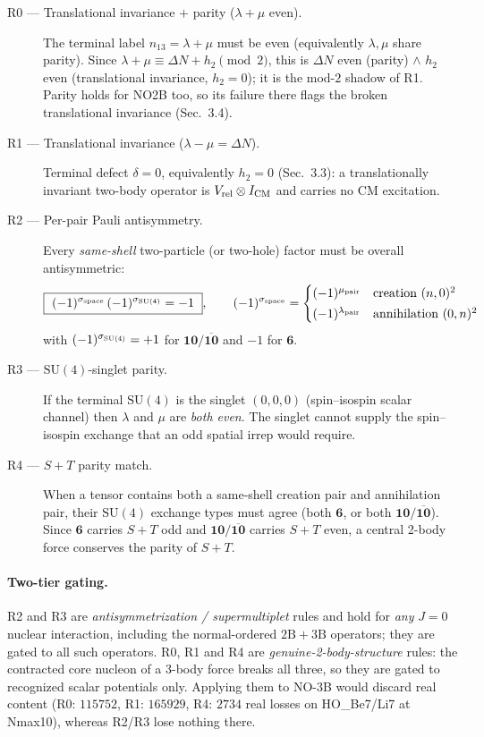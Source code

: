 \documentclass[11pt]{article}
\newcommand{\shift}{\ensuremath{\Delta N}}
\newcommand{\diff}{\ensuremath{\delta}}
\newcommand{\lm}{\ensuremath{\lambda}}
\newcommand{\mumu}{\ensuremath{\mu}}
\begin{document}
\begin{description}
\item[R0 --- Translational invariance $+$ parity ($\lm+\mumu$ even).] The
terminal label $n_{13}=\lm+\mumu$ must be even (equivalently $\lm,\mumu$ share
parity). Since $\lm+\mumu\equiv\shift+h_2\pmod2$, this is $\shift$ even (parity)
$\wedge$ $h_2$ even (translational invariance, $h_2=0$); it is the mod-$2$
shadow of R1. Parity holds for NO2B too, so its failure there flags the broken
translational invariance (Sec.~3.4).
\item[R1 --- Translational invariance ($\lm-\mumu=\shift$).] Terminal defect
$\diff=0$, equivalently $h_2=0$ (Sec.~3.3): a translationally invariant two-body
operator is $V_{\rm rel}\otimes I_{\rm CM}$ and carries no CM excitation.
\item[R2 --- Per-pair Pauli antisymmetry.] Every \emph{same-shell} two-particle
(or two-hole) factor must be overall antisymmetric:
\[
\boxed{\ (-1)^{\sigma_{\rm space}}\,(-1)^{\sigma_{\rm SU(4)}}=-1\ },\qquad
(-1)^{\sigma_{\rm space}}=\begin{cases}(-1)^{\mumu_{\rm pair}} & \text{creation }(n,0)^{2}\\[2pt]
(-1)^{\lm_{\rm pair}} & \text{annihilation }(0,n)^{2}\end{cases}
\]
with $(-1)^{\sigma_{\rm SU(4)}}=+1$ for $\mathbf{10}/\overline{\mathbf{10}}$ and
$-1$ for $\mathbf 6$.
\item[R3 --- $\mathrm{SU}(4)$-singlet parity.] If the terminal $\mathrm{SU}(4)$
is the singlet $(0,0,0)$ (spin--isospin scalar channel) then
$\lm$ and $\mumu$ are \emph{both even}. The singlet cannot supply the
spin--isospin exchange that an odd spatial irrep would require.
\item[R4 --- $S{+}T$ parity match.] When a tensor contains both a same-shell
creation pair and annihilation pair, their $\mathrm{SU}(4)$ exchange types must
agree (both $\mathbf 6$, or both $\mathbf{10}/\overline{\mathbf{10}}$). Since
$\mathbf 6$ carries $S{+}T$ odd and $\mathbf{10}/\overline{\mathbf{10}}$ carries
$S{+}T$ even, a central 2-body force conserves the parity of $S+T$.
\end{description}

\paragraph{Two-tier gating.} R2 and R3 are \emph{antisymmetrization /
supermultiplet} rules and hold for \emph{any} $J{=}0$ nuclear interaction,
including the normal-ordered $2\mathrm B{+}3\mathrm B$ operators; they are gated
to all such operators. R0, R1 and R4 are \emph{genuine-2-body-structure} rules:
the contracted core nucleon of a 3-body force breaks all three, so they are
gated to recognized scalar potentials only. Applying them to NO-3B would discard
real content (R0: $115752$, R1: $165929$, R4: $2734$ real losses on HO\_Be7/Li7
at Nmax10), whereas R2/R3 lose nothing there.
\end{document}
